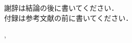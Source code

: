 \documentclass[a4paper]{jarticle}
\begin{document}
 謝辞は結論の後に書いてください．\\

 付録は参考文献の前に書いてください．

\cite{koeuranai},\cite{110008001037}


\end{document}
